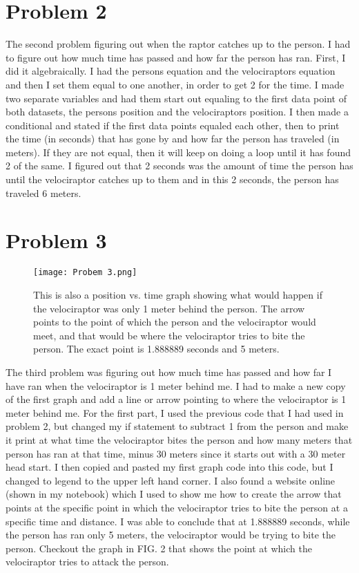 \documentclass[twocolumn]{revtex4}
\begin{document}
\section{Problem 2}
The second problem figuring out when the raptor catches up to the person. I had to figure out how much time has passed and how far the person has ran. First, I did it algebraically. I had the persons equation and the velociraptors equation and then I set them equal to one another, in order to get 2 for the time. I made two separate variables and had them start out equaling to the first data point of both datasets, the persons position and the velociraptors position. I then made a conditional and stated if the first data points equaled each other, then to print the time (in seconds) that has gone by and how far the person has traveled (in meters). If they are not equal, then it will keep on doing a loop until it has found 2 of the same. I figured out that 2 seconds was the amount of time the person has until the velociraptor catches up to them and in this 2 seconds, the person has traveled 6 meters.

\section{Problem 3}
\begin{figure}[b]
    \texttt{[image: Probem 3.png]}
    \centering
    \caption{This is also a position vs. time graph showing what would happen if the velociraptor was only 1 meter behind the person. The arrow points to the point of which the person and the velociraptor would meet, and that would be where the velociraptor tries to bite the person. The exact point is 1.888889 seconds and 5 meters. \label{fig:Plot 1}}
\end{figure}
The third problem was figuring out how much time has passed and how far I have ran when the velociraptor is 1 meter behind me. I had to make a new copy of the first graph and add a line or arrow pointing to where the velociraptor is 1 meter behind me. For the first part, I used the previous code that I had used in problem 2, but changed my if statement to subtract 1 from the person and make it print at what time the velociraptor bites the person and how many meters that person has ran at that time, minus 30 meters since it starts out with a 30 meter head start. I then copied and pasted my first graph code  into this code, but I changed to legend to the upper left hand corner. I also found a website online (shown in my notebook) which I used to show me how to create the arrow that points at the specific point in which the velociraptor tries to bite the person at a specific time and distance. I was able to conclude that at 1.888889 seconds, while the person has ran only 5 meters, the velociraptor would be trying to bite the person. Checkout the graph in FIG. 2 that shows the point at which the velociraptor tries to attack the person.
\end{document}
